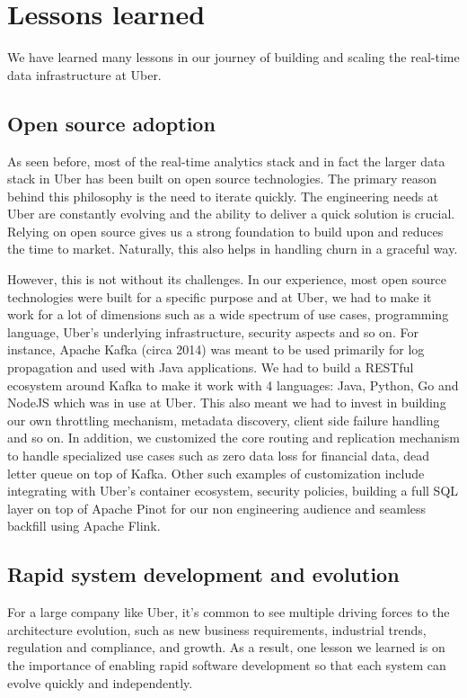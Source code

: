 \documentclass[sigconf]{acmart}
\begin{document}
\section{Lessons learned} \label{sec:lessons}

We have learned many lessons in our journey of building and scaling the real-time data infrastructure at Uber.

\subsection{Open source adoption}

As seen before, most of the real-time analytics stack and in fact the larger data stack in Uber has been built on open source technologies. The primary reason behind this philosophy is the need to iterate quickly. The engineering needs at Uber are constantly evolving and the ability to deliver a quick solution is crucial. Relying on open source gives us a strong foundation to build upon and reduces the time to market. Naturally, this also helps in handling churn in a graceful way. 

However, this is not without its challenges. In our experience, most open source technologies were built for a specific purpose and at Uber, we had to make it work for a lot of dimensions such as a wide spectrum of use cases, programming language, Uber’s underlying infrastructure, security aspects and so on. For instance, Apache Kafka (circa 2014) was meant to be used primarily for log propagation and used with Java applications. We had to build a RESTful ecosystem around Kafka to make it work with 4 languages: Java, Python, Go and NodeJS which was in use at Uber. This also meant we had to invest in building our own throttling mechanism, metadata discovery, client side failure handling and so on. In addition, we customized the core routing and replication mechanism to handle specialized use cases such as zero data loss for financial data, dead letter queue on top of Kafka. Other such examples of customization include integrating with Uber’s container ecosystem, security policies, building a full SQL layer on top of Apache Pinot for our non engineering audience and seamless backfill using Apache Flink.

\subsection{Rapid system development and evolution}

For a large company like Uber, it’s common to see multiple driving forces to the architecture evolution, such as new business requirements, industrial trends, regulation and compliance, and growth. As a result, one lesson we learned is on the importance of enabling rapid software development so that each system can evolve quickly and independently. 
\end{document}
